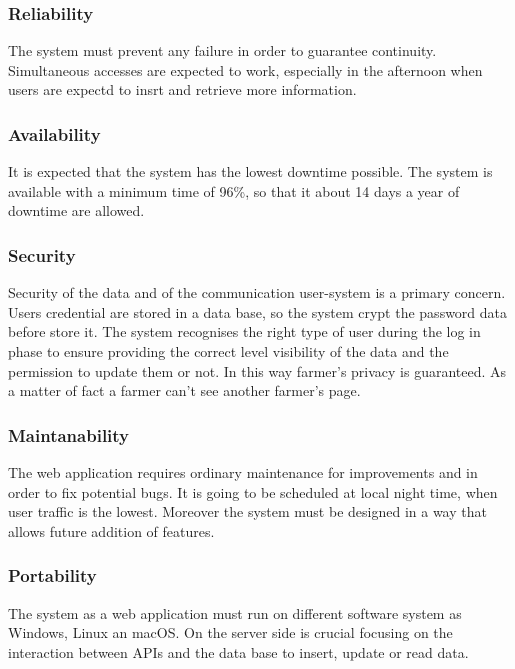 \subsubsection{Reliability}
The system must prevent any failure in order to guarantee continuity. 
Simultaneous accesses are expected to work, especially in the afternoon when users are expectd to insrt and retrieve more information.

\subsubsection{Availability}
It is expected that the system has the lowest downtime possible. 
The system is available with a minimum time of 96\%, 
so that it about 14 days a year of downtime are allowed.


\subsubsection{Security}
\label{subsubsection:3.4.3}
Security of the data and of the communication user-system is a primary concern. Users credential are stored in a data base, so the system crypt the password data before store it. The system recognises the right type of user during the log in phase to ensure providing the correct level visibility of the data and the permission to update them or not. In this way farmer’s privacy is guaranteed. As a matter of fact a farmer can’t see another farmer’s page.


\subsubsection{Maintanability}
The web application requires ordinary maintenance for improvements and in order to fix potential bugs. 
It is going to be scheduled at local night time, when user traffic is the lowest.
Moreover the system must be designed in a way that allows future addition of features.

\subsubsection{Portability}
The system as a web application must run on different software system as Windows, Linux an macOS.
On the server side is crucial focusing on the interaction between APIs and the data base to insert, update or read data.

